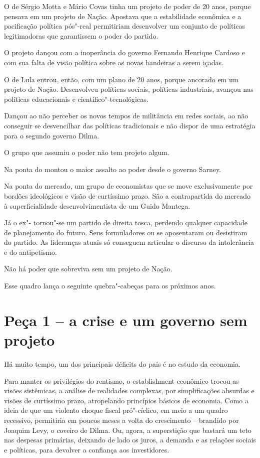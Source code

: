  

O  de Sérgio Motta e Mário Covas tinha um projeto de poder de 20
anos, porque pensava em um projeto de Nação. Apostava que a estabilidade
econômica e a pacificação política pós"-real permitiriam desenvolver um
conjunto de políticas legitimadoras que garantissem o poder do partido.

O projeto dançou com a inoperância do governo Fernando Henrique Cardoso
e com sua falta de visão política sobre as novas bandeiras a serem
içadas.

O  de Lula entrou, então, com um plano de 20 anos, porque ancorado em
um projeto de Nação. Desenvolveu políticas sociais, políticas
industriais, avançou nas políticas educacionais e
científico"-tecnológicas.

Dançou ao não perceber os novos tempos de militância em redes sociais,
ao não conseguir se desvencilhar das políticas tradicionais e não dispor
de uma estratégia para o segundo governo Dilma.

O grupo que assumiu o poder não tem projeto algum.

Na ponta do  montou o maior assalto ao poder desde o governo Sarney.

Na ponta do mercado, um grupo de economistas que se move exclusivamente
por bordões ideológicos e visão de curtíssimo prazo. São a contrapartida
do mercado à superficialidade desenvolvimentista de um Guido Mantega.

Já o ex"- tornou"-se um partido de direita tosca, perdendo qualquer
capacidade de planejamento do futuro. Seus formuladores ou se
aposentaram ou desistiram do partido. As lideranças atuais só conseguem
articular o discurso da intolerância e do antipetismo.

Não há poder que sobreviva sem um projeto de Nação.

Esse quadro lança o seguinte quebra"-cabeças para os próximos anos.

\section{Peça 1 -- a crise e um governo sem projeto}

Há muito tempo, um dos principais déficits do país é no estudo da
economia.

Para manter os privilégios do rentismo, o establishment econômico trocou
as visões sistêmicas, a análise de realidades complexas, por
simplificações absurdas e visões de curtíssimo prazo, atropelando
princípios básicos de economia. Como a ideia de que um violento choque
fiscal pró"-cíclico, em meio a um quadro recessivo, permitiria em poucos
meses a volta do crescimento -- brandido por Joaquim Levy, o coveiro de
Dilma. Ou, agora, a superstição que bastará um teto nas despesas
primárias, deixando de lado os juros, a demanda e as relações sociais e
políticas, para devolver a confiança aos investidores.

